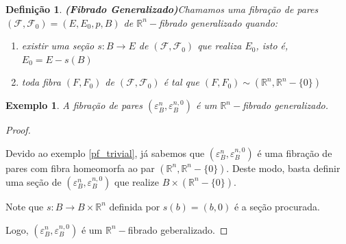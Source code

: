 \documentclass[12pt,oneside]{book} %
\newtheorem{defi}   {\hspace{0.5cm}Defini\c c\~ao}[chapter]
\newtheorem{ex}     {\hspace{0.5cm}Exemplo}[chapter]
\newcommand{\R}{\mathbb{R}}
\begin{document}
\begin{defi}{\bf (Fibrado Generalizado)}\label{defi_fib_gen}
	Chamamos uma fibração de pares $(\mathcal{F},\mathcal{F}_{0})=(E,E_{0},p,B)$ de $\R^{n}-$fibrado generalizado quando:
	
	\begin{enumerate}
		\item existir uma seção $s:B\to E$ de $(\mathcal{F},\mathcal{F}_{0})$ que realiza $E_{0}$, isto é, $E_{0}=E-s(B)$
		\item toda fibra $(F,F_{0})$ de $(\mathcal{F},\mathcal{F}_{0})$ é tal que $(F,F_{0})\sim (\R^{n},\R^{n}-\{ 0 \})$
	\end{enumerate}
\end{defi}

\begin{ex}\label{fht_trivial}
	A fibração de pares $(\varepsilon^{n}_{B},\varepsilon^{n,0}_{B})$ é um $\R^{n}-$fibrado generalizado.
\end{ex}
\begin{proof}
	
	\
	
	\par Devido ao exemplo \ref{pf_trivial}, já sabemos que $(\varepsilon^{n}_{B},\varepsilon^{n,0}_{B})$ é uma fibração de pares com fibra homeomorfa ao par $(\R^{n},\R^{n}-\{ 0 \})$. Deste modo, basta definir uma seção de $(\varepsilon^{n}_{B},\varepsilon^{n,0}_{B})$ que realize $B\times(\R^{n}-\{ 0 \})$.
	
	\par Note que $s:B\to B\times\R^{n}$ definida por $s(b)=(b,0)$ é a seção procurada.
	
	\par Logo, $(\varepsilon^{n}_{B},\varepsilon^{n,0}_{B})$ é um $\R^{n}-$fibrado geberalizado.
	
\end{proof}
\end{document}
